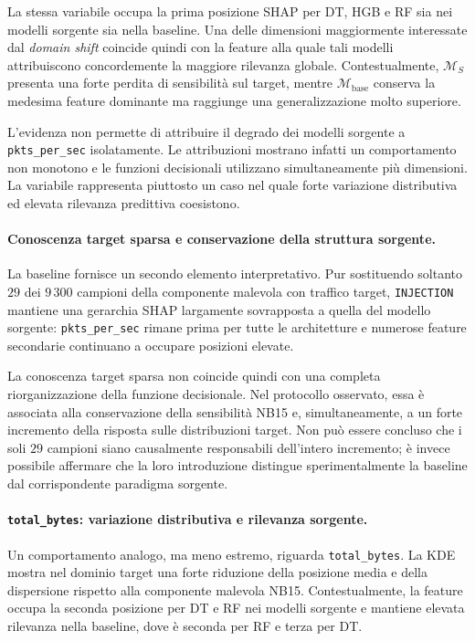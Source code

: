 La stessa variabile occupa la prima posizione SHAP per DT, HGB e RF sia nei modelli sorgente sia nella baseline. 
Una delle dimensioni maggiormente interessate dal \textit{domain shift} coincide quindi con la feature alla quale tali modelli attribuiscono concordemente la maggiore rilevanza globale.
Contestualmente, $\mathcal{M}_{S}$ presenta una forte perdita di sensibilità sul target, mentre $\mathcal{M}_{\mathrm{base}}$ conserva la medesima feature dominante ma raggiunge una generalizzazione molto superiore.

L'evidenza non permette di attribuire il degrado dei modelli sorgente a \texttt{pkts\_per\_sec} isolatamente. 
Le attribuzioni mostrano infatti un comportamento non monotono e le funzioni decisionali utilizzano simultaneamente più dimensioni. 
La variabile rappresenta piuttosto un caso nel quale forte variazione distributiva ed elevata rilevanza predittiva coesistono.

\paragraph{Conoscenza target sparsa e conservazione della struttura sorgente.}
La baseline fornisce un secondo elemento interpretativo. 
Pur sostituendo soltanto $29$ dei $9\,300$ campioni della componente malevola con traffico target, \texttt{INJECTION} mantiene una gerarchia SHAP largamente sovrapposta a quella del modello sorgente: \texttt{pkts\_per\_sec} rimane prima per tutte le architetture e numerose feature secondarie continuano a occupare posizioni elevate.

La conoscenza target sparsa non coincide quindi con una completa riorganizzazione della funzione decisionale. 
Nel protocollo osservato, essa è associata alla conservazione della sensibilità NB15 e, simultaneamente, a un forte incremento della risposta sulle distribuzioni target. 
Non può essere concluso che i soli $29$ campioni siano causalmente responsabili dell'intero incremento; è invece possibile affermare che la loro introduzione distingue sperimentalmente la baseline dal corrispondente paradigma sorgente.

\paragraph{\texttt{total\_bytes}: variazione distributiva e rilevanza sorgente.}
Un comportamento analogo, ma meno estremo, riguarda \texttt{total\_bytes}. 
La KDE mostra nel dominio target una forte riduzione della posizione media e della dispersione rispetto alla componente malevola NB15. 
Contestualmente, la feature occupa la seconda posizione per DT e RF nei modelli sorgente e mantiene elevata rilevanza nella baseline, dove è seconda per RF e terza per DT.

